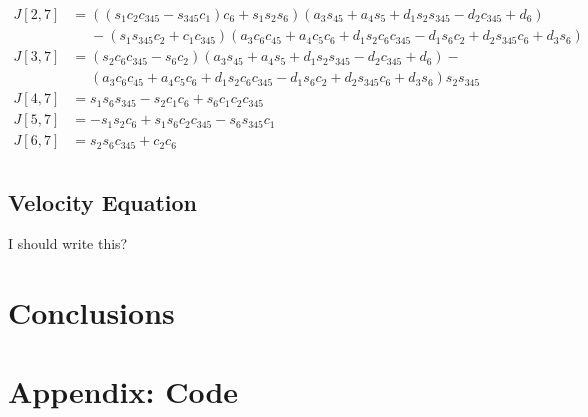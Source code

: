 \documentclass{article}
\begin{document}
\begin{align*}
J[2,7] &= \left(\left(s_{1} c_{2} c_{345} - s_{345} c_{1}\right) c_{6} + s_{1} s_{2} s_{6}\right) \left(a_{3} s_{45} + a_{4} s_{5} + d_{1} s_{2} s_{345} - d_{2} c_{345} + d_{6}\right) \\
       &\phantom{=}- \left(s_{1} s_{345} c_{2} + c_{1} c_{345}\right) \left(a_{3} c_{6} c_{45} + a_{4} c_{5} c_{6} + d_{1} s_{2} c_{6} c_{345} - d_{1} s_{6} c_{2} + d_{2} s_{345} c_{6} + d_{3} s_{6}\right) \\
J[3,7] &= \left(s_{2} c_{6} c_{345} - s_{6} c_{2}\right) \left(a_{3} s_{45} + a_{4} s_{5} + d_{1} s_{2} s_{345} - d_{2} c_{345} + d_{6}\right) - \\
       &\phantom{=}\left(a_{3} c_{6} c_{45} + a_{4} c_{5} c_{6} + d_{1} s_{2} c_{6} c_{345} - d_{1} s_{6} c_{2} + d_{2} s_{345} c_{6} + d_{3} s_{6}\right) s_{2} s_{345} \\
J[4,7] &= s_{1} s_{6} s_{345} - s_{2} c_{1} c_{6} + s_{6} c_{1} c_{2} c_{345} \\
J[5,7] &= - s_{1} s_{2} c_{6} + s_{1} s_{6} c_{2} c_{345} - s_{6} s_{345} c_{1} \\
J[6,7] &= s_{2} s_{6} c_{345} + c_{2} c_{6} \\
\end{align*}

\subsection{Velocity Equation}
I should write this?

\section{Conclusions}

\nocite{*}



\clearpage
\appendix
\section{Appendix: Code}

\end{document}
